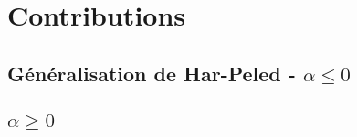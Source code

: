 \section{Contributions}

\subsection{Généralisation de Har-Peled - $\alpha \leq 0$}

\subsection{$\alpha \geq 0$}
